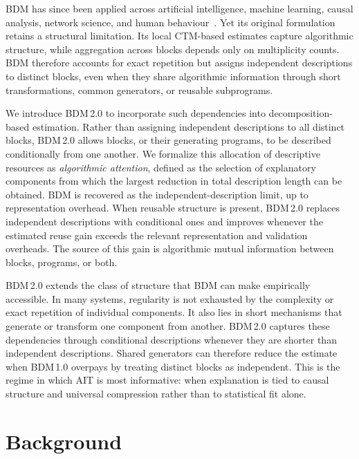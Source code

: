 \documentclass{article}
\begin{document}
BDM has since been applied across artificial intelligence, machine learning, causal analysis, network science, and human behaviour~\cite{hernandez-espinosa_superarc_2026,sakabe_binarized_2026,bakhtiarifard_characterizing_2026,hernandez-orozco_algorithmic_2021,zenil_causal_2019,zenil_minimal_2025,gauvrit_human_2017}. Yet its original formulation retains a structural limitation. Its local CTM-based estimates capture algorithmic structure, while aggregation across blocks depends only on multiplicity counts. BDM therefore accounts for exact repetition but assigns independent descriptions to distinct blocks, even when they share algorithmic information through short transformations, common generators, or reusable subprograms.

We introduce BDM\,2.0 to incorporate such dependencies into decomposition-based estimation. Rather than assigning independent descriptions to all distinct blocks, BDM\,2.0 allows blocks, or their generating programs, to be described conditionally from one another. We formalize this allocation of descriptive resources as \emph{algorithmic attention}, defined as the selection of explanatory components from which the largest reduction in total description length can be obtained. BDM is recovered as the independent-description limit, up to representation overhead. When reusable structure is present, BDM\,2.0 replaces independent descriptions with conditional ones and improves whenever the estimated reuse gain exceeds the relevant representation and validation overheads. The source of this gain is algorithmic mutual information between blocks, programs, or both.

BDM\,2.0 extends the class of structure that BDM can make empirically accessible. In many systems, regularity is not exhausted by the complexity or exact repetition of individual components. It also lies in short mechanisms that generate or transform one component from another. BDM\,2.0 captures these dependencies through conditional descriptions whenever they are shorter than independent descriptions. Shared generators can therefore reduce the estimate when BDM\,1.0 overpays by treating distinct blocks as independent. This is the regime in which AIT is most informative: when explanation is tied to causal structure and universal compression rather than to statistical fit alone.

\section{Background}
\end{document}
